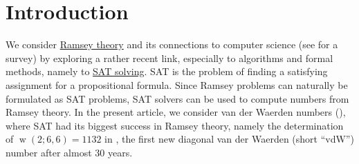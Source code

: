 \documentclass[final,3p,times]{elsarticle}
\theoremstyle{definition}
\DeclareMathOperator{\vdw}{w}
\begin{document}
\tableofcontents


\section{Introduction}
\label{sec:intro}

We consider \href{http://en.wikipedia.org/wiki/Ramsey_theory}{Ramsey theory} and its connections to computer science (see \cite{Rosta2004RamseySurvey}
for a survey)
by exploring a rather recent link, especially to algorithms and formal methods, namely to \href{http://en.wikipedia.org/wiki/Boolean_satisfiability_problem}{SAT solving}.
SAT is the problem of finding a satisfying assignment for a propositional formula.
Since Ramsey problems can naturally be formulated as SAT problems,
SAT solvers can be used to compute numbers from Ramsey theory.
In the present article, we consider van der Waerden numbers (\cite{vanderWaerden1927Baudet}),
where SAT had its biggest success in Ramsey theory, namely the determination of $\vdw(2; 6,6) = 1132$ in \cite{KourilPaulW26}, the first new diagonal van der Waerden (short ``vdW'') number after almost 30 years.
\end{document}
